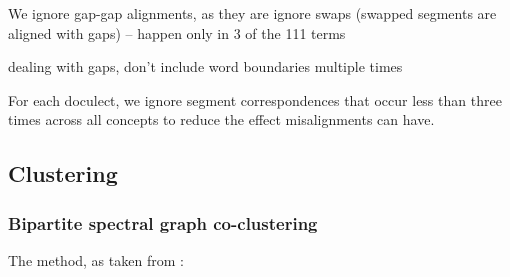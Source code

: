 \documentclass[a4paper]{article}
\begin{document}
We ignore gap-gap alignments, as they are 
ignore swaps (swapped segments are aligned with gaps) -- happen only in 3 of the 111 terms

dealing with gaps, don't include word boundaries multiple times

For each doculect, we ignore segment correspondences that occur less than three times across all concepts to reduce the effect misalignments can have.

\subsection{Clustering}

\subsubsection{Bipartite spectral graph co-clustering}

The method, as taken from \citet{dhillon2001co-clustering}:
\end{document}
